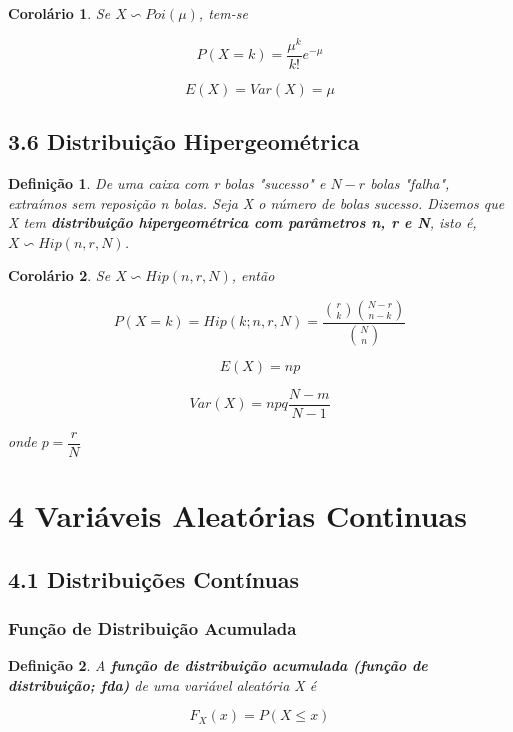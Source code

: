 \documentclass[12pt]{article}
\newtheorem{corollary}{Corolário}[theorem]
\newtheorem{definition}{Definição}
\begin{document}
\begin{corollary}
    Se $X \backsim Poi (\mu)$, tem-se
    
    $$P(X = k) = \frac{\mu^k}{k!} e^{-\mu}$$
    
    $$E(X) = Var(X) = \mu$$
\end{corollary}

\subsection*{3.6 Distribuição Hipergeométrica}
\label{s16}

\begin{definition}
    De uma caixa com r bolas "sucesso" e $N-r$ bolas "falha", extraímos sem reposição n bolas. Seja X o número de bolas sucesso. Dizemos que X tem \textbf{distribuição hipergeométrica com parâmetros n, r e N}, isto é, $X \backsim Hip (n, r, N)$.
\end{definition}
    
\begin{corollary}
    Se $X \backsim Hip (n, r, N)$, então
    
    $$P(X = k) = Hip (k; n, r, N) = \dfrac{{r \choose k}{N-r \choose n-k}}{{N \choose n}}$$
    
    $$E(X) = n p$$
    
    $$Var(X) = n p q \frac{N - m}{N -1}$$
    
    onde $p = \dfrac{r}{N}$
\end{corollary}

\section*{4 Variáveis Aleatórias Continuas}
\label{s17}

\subsection*{4.1 Distribuições Contínuas}
\label{s18}

\subsubsection*{Função de Distribuição Acumulada}

\begin{definition}
    A \textbf{função de distribuição acumulada (função de distribuição; fda)} de uma variável aleatória X é
    
    $$F_X(x) = P(X \leq x)$$
\end{definition}
\end{document}
